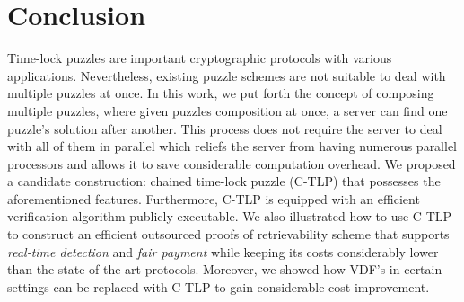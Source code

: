 
\section{Conclusion}


Time-lock puzzles are important cryptographic protocols with various applications. Nevertheless,  existing puzzle schemes are not suitable to deal with multiple puzzles at once.  In this work, we put forth the concept of composing multiple puzzles, where given puzzles composition at once, a server can find one puzzle's solution after another. This process does not require the server to deal with all of them in parallel which reliefs the server from having numerous parallel processors and allows it to save considerable computation overhead. We proposed a candidate construction: chained  time-lock puzzle (C-TLP) that possesses the aforementioned features. Furthermore, C-TLP is equipped with an efficient verification algorithm publicly executable.  We also illustrated how to use C-TLP to construct an  efficient outsourced  proofs of retrievability scheme that supports \emph{real-time detection} and \emph{fair payment} while keeping its costs considerably lower than the state of the art protocols. Moreover, we showed how VDF's in certain settings can be replaced with C-TLP to gain considerable cost improvement.








